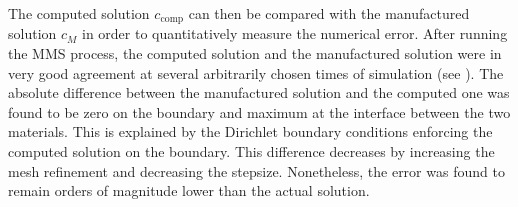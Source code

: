 The computed solution $c_\mathrm{comp}$ can then be compared with the manufactured solution $c_M$ in order to quantitatively measure the numerical error.
After running the MMS process, the computed solution and the manufactured solution were in very good agreement at several arbitrarily chosen times of simulation (see ).
The absolute difference between the manufactured solution and the computed one was found to be zero on the boundary and maximum at the interface between the two materials.
This is explained by the Dirichlet boundary conditions enforcing the computed solution on the boundary.
This difference decreases by increasing the mesh refinement and decreasing the stepsize.
Nonetheless, the error was found to remain orders of magnitude lower than the actual solution.

